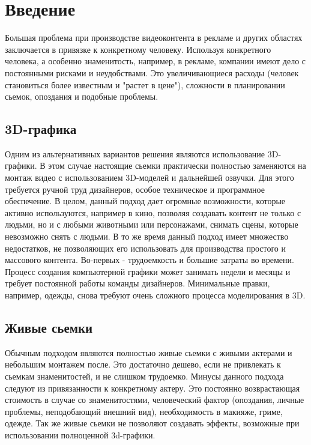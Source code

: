 \section{Введение}

Большая проблема при производстве видеоконтента в рекламе и других областях заключается в привязке к конкретному человеку. Используя конкретного человека, а особенно знаменитость, например, в рекламе, компании имеют дело с постоянными рисками и неудобствами. Это увеличивающиеся расходы (человек становиться более известным и "растет в цене"), сложности в планировании сьемок, опоздания и подобные проблемы.

\subsection{3D-графика}

Одним из альтернативных вариантов решения являются использование 3D-графики. В этом случае настоящие сьемки практически полностью заменяются на монтаж видео с использованием 3D-моделей и дальнейшей озвучки.
Для этого требуется ручной труд дизайнеров, особое техническое и программное обеспечение.
В целом, данный подход дает огромные возможности, которые активно используются, например в кино, позволяя создавать контент не только с людьми, но и с любыми животными или персонажами, снимать сцены, которые невозможно снять с людьми.
В то же время данный подход имеет множество недостатков, не позволяющих его использовать для производства простого и массового контента. Во-первых - трудоемкость и большие затраты во времени. Процесс создания компьютерной графики может занимать недели и месяцы и требует постоянной работы команды дизайнеров. Минимальные правки, например, одежды, снова требуют очень сложного процесса моделирования в 3D.

\subsection{Живые сьемки}

Обычным подходом являются полностью живые сьемки с живыми актерами и небольшим монтажем после. Это достаточно дешево, если не привлекать к сьемкам знаменитостей, и не слишком трудоемко. Минусы данного подхода следуют из привязанности к конкретному актеру.
Это постоянно возврастающая стоимость в случае со знаменитостями, человеческий фактор (опоздания, личные проблемы, неподобающий внешний вид), необходимость в макияже, гриме, одежде. Так же живые сьемки не позволяют создавать эффекты, возможные при использовании полноценной 3d-графики.

